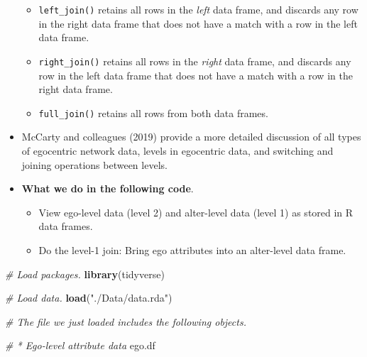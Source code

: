 \documentclass[
]{book}
\newenvironment{Shaded}{\begin{snugshade}}{\end{snugshade}}
\newcommand{\CommentTok}[1]{\textcolor[rgb]{0.56,0.35,0.01}{\textit{#1}}}
\newcommand{\FunctionTok}[1]{\textcolor[rgb]{0.13,0.29,0.53}{\textbf{#1}}}
\newcommand{\NormalTok}[1]{#1}
\newcommand{\StringTok}[1]{\textcolor[rgb]{0.31,0.60,0.02}{#1}}
\providecommand{\tightlist}{%
  \setlength{\itemsep}{0pt}\setlength{\parskip}{0pt}}
\begin{document}
\begin{itemize}
  \begin{itemize}
  \tightlist
  \item
    \texttt{left\_join()} retains all rows in the \emph{left} data frame, and discards any row in the right data frame that does not have a match with a row in the left data frame.
  \item
    \texttt{right\_join()} retains all rows in the \emph{right} data frame, and discards any row in the left data frame that does not have a match with a row in the right data frame.
  \item
    \texttt{full\_join()} retains all rows from both data frames.
  \end{itemize}
\item
  McCarty and colleagues (2019) provide a more detailed discussion of all types of egocentric network data, levels in egocentric data, and switching and joining operations between levels.
\item
  \textbf{What we do in the following code}.

  \begin{itemize}
  \tightlist
  \item
    View ego-level data (level 2) and alter-level data (level 1) as stored in R data frames.
  \item
    Do the level-1 join: Bring ego attributes into an alter-level data frame.
  \end{itemize}
\end{itemize}

\begin{Shaded}
\begin{Highlighting}[]
\CommentTok{\# Load packages.}
\FunctionTok{library}\NormalTok{(tidyverse)}

\CommentTok{\# Load data.}
\FunctionTok{load}\NormalTok{(}\StringTok{"./Data/data.rda"}\NormalTok{)}

\CommentTok{\# The file we just loaded includes the following objects.}

\CommentTok{\# * Ego{-}level attribute data}
\NormalTok{ego.df}
\end{Highlighting}
\end{Shaded}
\end{document}
